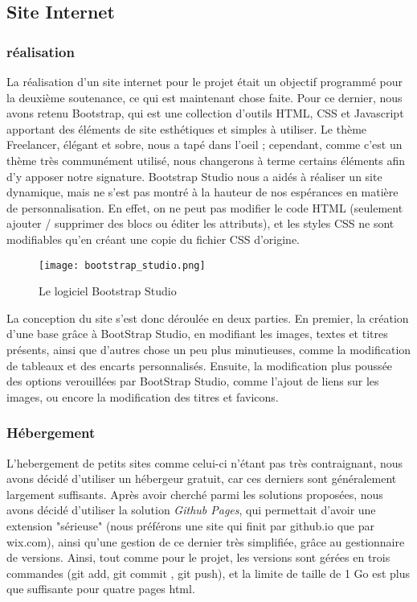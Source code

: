 \subsection{Site Internet}

    \subsubsection{réalisation}

    La réalisation d'un site internet pour le projet était un objectif
    programmé pour la deuxième soutenance, ce qui est maintenant chose faite.
    Pour ce dernier, nous avons retenu Bootstrap, qui est une collection
    d'outils HTML, CSS et Javascript apportant des éléments de site
    esthétiques et simples à utiliser. Le thème Freelancer, élégant et sobre,
    nous a tapé dans l'oeil ; cependant, comme c'est un thème très 
    communément utilisé, nous changerons à terme certains éléments afin 
    d'y apposer notre signature. Bootstrap Studio nous a aidés à réaliser
    un site dynamique, mais ne s'est pas montré à la hauteur de nos espérances
    en matière de personnalisation. En effet, on ne peut pas modifier
    le code HTML (seulement ajouter / supprimer des blocs ou éditer les
    attributs), et les styles CSS ne sont modifiables qu'en créant une copie
    du fichier CSS d'origine.

    \begin{figure}[hbt!]
        \centering
        \texttt{[image: bootstrap\_studio.png]}
        \caption{Le logiciel Bootstrap Studio}
    \end{figure}

    La conception du site s'est donc déroulée en deux parties. En premier, la création
    d'une base grâce à BootStrap Studio, en modifiant les images, textes et titres présents, ainsi
    que d'autres chose un peu plus minutieuses, comme la modification de tableaux et des encarts personnalisés.
    Ensuite, la modification plus poussée des options verouillées par BootStrap Studio, comme l'ajout de liens 
    sur les images, ou encore la modification des titres et favicons.


    \subsubsection{Hébergement}

    L'hebergement de petits sites comme celui-ci n'étant pas très contraignant,
    nous avons décidé d'utiliser un hébergeur gratuit, car ces derniers
    sont généralement largement suffisants. Après avoir cherché parmi les
    solutions proposées, nous avons décidé d'utiliser la solution 
    \textit{Github Pages}, qui permettait d'avoir une extension "sérieuse"
    (nous préférons une site qui finit par github.io que par wix.com),
    ainsi qu'une gestion de ce dernier très simplifiée, grâce au gestionnaire de versions.
    Ainsi, tout comme pour le projet, les versions sont gérées en trois commandes 
    (git add, git commit , git push), et la limite de taille de 1 Go est plus que suffisante pour quatre pages html. 



